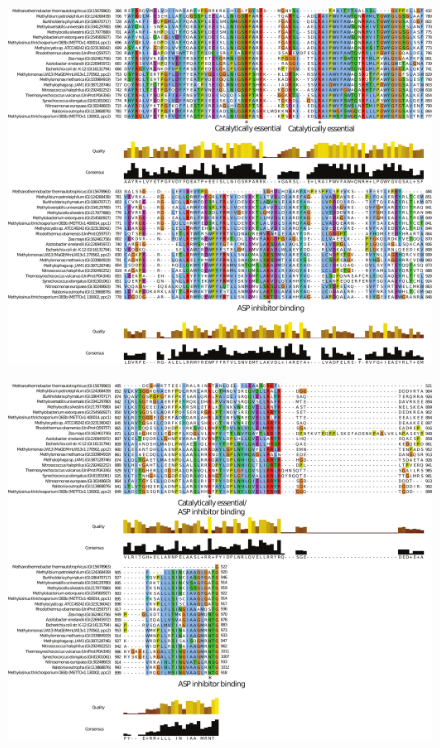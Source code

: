 \begin{figure}[H]
\centering
     \includegraphics[width=1.0\textwidth]{./tex/chapter1/figures/supplemental/FigureS6f.pdf}
\end{figure}


\begin{figure}[H]
\centering
     \includegraphics[width=1.0\textwidth]{./tex/chapter1/figures/supplemental/FigureS6g.pdf}
\end{figure}



